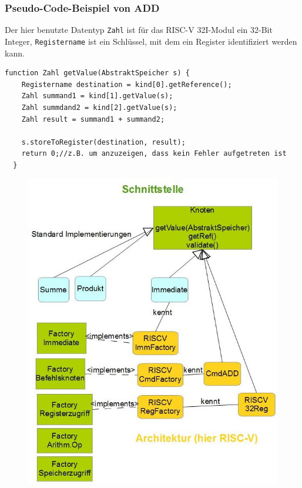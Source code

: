 \subsubsection{Pseudo-Code-Beispiel von ADD}
Der hier benutzte Datentyp \texttt{Zahl} ist für das RISC-V 32I-Modul ein 32-Bit Integer, \texttt{Registername} ist ein Schlüssel, mit dem ein Register identifiziert werden kann.
\begin{lstlisting}[style=C++]
  function Zahl getValue(AbstraktSpeicher s) {
    Registername destination = kind[0].getReference();
    Zahl summand1 = kind[1].getValue(s);
    Zahl summdand2 = kind[2].getValue(s);
    Zahl result = summand1 + summand2;

    s.storeToRegister(destination, result);
    return 0;//z.B. um anzuzeigen, dass kein Fehler aufgetreten ist
  }
\end{lstlisting}
\begin{figure}[h!]
\centering
\includegraphics[scale=0.5]{../arch/figures/zeichnung}
\end{figure}

